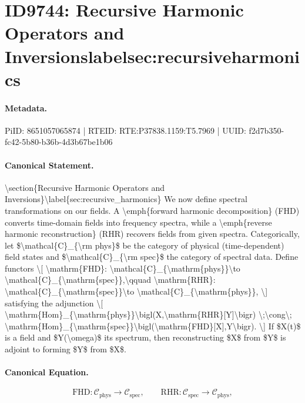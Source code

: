 \section*{ID9744: Recursive Harmonic Operators and Inversionslabelsec:recursiveharmonics}
\paragraph{Metadata.}
PiID: 8651057065874 | RTEID: RTE:P37838.1159:T5.7969 | UUID: f2d7b350-fc42-5b80-b36b-4d3b67be1b06

\paragraph{Canonical Statement.}
\textbackslash{}section\{Recursive Harmonic Operators and Inversions\}\textbackslash{}label\{sec:recursive\_harmonics\} We now define spectral transformations on our fields. A \textbackslash{}emph\{forward harmonic decomposition\} (FHD) converts time-domain fields into frequency spectra, while a \textbackslash{}emph\{reverse harmonic reconstruction\} (RHR) recovers fields from given spectra. Categorically, let \$\textbackslash{}mathcal\{C\}\_\{\textbackslash{}rm phys\}\$ be the category of physical (time-dependent) field states and \$\textbackslash{}mathcal\{C\}\_\{\textbackslash{}rm spec\}\$ the category of spectral data. Define functors \textbackslash{}[ \textbackslash{}mathrm\{FHD\}: \textbackslash{}mathcal\{C\}\_\{\textbackslash{}mathrm\{phys\}\}\textbackslash{}to \textbackslash{}mathcal\{C\}\_\{\textbackslash{}mathrm\{spec\}\},\textbackslash{}qquad \textbackslash{}mathrm\{RHR\}: \textbackslash{}mathcal\{C\}\_\{\textbackslash{}mathrm\{spec\}\}\textbackslash{}to \textbackslash{}mathcal\{C\}\_\{\textbackslash{}mathrm\{phys\}\}, \textbackslash{}] satisfying the adjunction \textbackslash{}[ \textbackslash{}mathrm\{Hom\}\_\{\textbackslash{}mathrm\{phys\}\}\textbackslash{}bigl(X,\textbackslash{}mathrm\{RHR\}[Y]\textbackslash{}bigr) \textbackslash{};\textbackslash{}cong\textbackslash{}; \textbackslash{}mathrm\{Hom\}\_\{\textbackslash{}mathrm\{spec\}\}\textbackslash{}bigl(\textbackslash{}mathrm\{FHD\}[X],Y\textbackslash{}bigr). \textbackslash{}] If \$X(t)\$ is a field and \$Y(\textbackslash{}omega)\$ its spectrum, then reconstructing \$X\$ from \$Y\$ is adjoint to forming \$Y\$ from \$X\$.

\paragraph{Canonical Equation.}
\[
\mathrm{FHD}: \mathcal{C}_{\mathrm{phys}}\to \mathcal{C}_{\mathrm{spec}},\qquad \mathrm{RHR}: \mathcal{C}_{\mathrm{spec}}\to \mathcal{C}_{\mathrm{phys}},
\]

